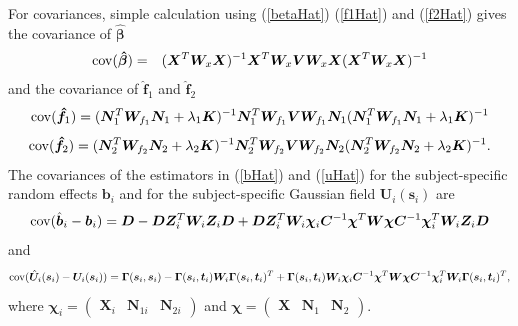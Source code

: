 \documentclass[12pt, notitlepage]{article}
\begin{document}
  
For covariances, simple calculation using (\ref{betaHat}) (\ref{f1Hat}) and (\ref{f2Hat}) gives the covariance of $\boldsymbol {\hat \beta}$  
\begin{eqnarray*}
{\rm cov}(\boldsymbol {\hat \beta}) 
&=&
(\boldsymbol X^T  \boldsymbol W_x \boldsymbol X )^{-1} \boldsymbol X^T  \boldsymbol W_x 
\boldsymbol V 
\boldsymbol W_x \boldsymbol X (\boldsymbol X^T  \boldsymbol W_x \boldsymbol X )^{-1} 
\end{eqnarray*}
and the covariance of $\boldsymbol {\hat f}_1$  and $\boldsymbol {\hat f}_2$
$$
{\rm cov}(\boldsymbol {\hat f}_1) 
=
(\boldsymbol N_1^T 
\boldsymbol W_{f_1}  \boldsymbol N_1
  + \lambda_1 \boldsymbol K)^{-1}  \boldsymbol N_1^T \boldsymbol W_{f_1}
   \boldsymbol V 
\boldsymbol W_{f_1} \boldsymbol N_1
(\boldsymbol N_1^T 
\boldsymbol W_{f_1}  \boldsymbol N_1
  + \lambda_1 \boldsymbol K)^{-1}
$$
$$
{\rm cov}(\boldsymbol {\hat f}_2) 
=
(\boldsymbol N_2^T \boldsymbol W_{f_2}  \boldsymbol N_2 + \lambda_2 \boldsymbol K)^{-1} 
\boldsymbol N_2^T \boldsymbol W_{f_2} 
   \boldsymbol V 
\boldsymbol W_{f_2} \boldsymbol N_2
(\boldsymbol N_2^T \boldsymbol W_{f_2}  \boldsymbol N_2 + \lambda_2 \boldsymbol K)^{-1}.
$$
The covariances of the estimators in (\ref{bHat}) and (\ref{uHat}) for the subject-specific random effects $\boldsymbol b_i$ and for the subject-specific Gaussian field $\boldsymbol U_i(\boldsymbol s_i)$
 are  
$$
{\rm cov}(\hat{\boldsymbol b}_i - \boldsymbol b_i) 
= \boldsymbol D 
-
\boldsymbol D \boldsymbol Z_i^T \boldsymbol W_i  \boldsymbol Z_i  \boldsymbol D 
+
\boldsymbol D \boldsymbol Z_i^T \boldsymbol W_i
\boldsymbol \chi_i  \boldsymbol C^{-1} \boldsymbol \chi^T
\boldsymbol W
\boldsymbol \chi  \boldsymbol C^{-1} \boldsymbol \chi_i^T
\boldsymbol  W_i \boldsymbol Z_i \boldsymbol D
$$
and 
$$
{\rm cov}(\hat{\boldsymbol U}_i (\boldsymbol s_i) - \boldsymbol U_i (\boldsymbol s_i) ) 
= \boldsymbol \Gamma(\boldsymbol s_i, \boldsymbol s_i) 
-
\boldsymbol \Gamma(\boldsymbol s_i, \boldsymbol t_i) 
\boldsymbol W_i  
\boldsymbol \Gamma(\boldsymbol s_i, \boldsymbol t_i)^T 
+
\boldsymbol \Gamma(\boldsymbol s_i, \boldsymbol t_i) \boldsymbol W_i
\boldsymbol \chi_i  \boldsymbol C^{-1} \boldsymbol \chi^T
\boldsymbol W
\boldsymbol \chi  \boldsymbol C^{-1} \boldsymbol \chi_i^T
\boldsymbol  W_i \boldsymbol \Gamma(\boldsymbol s_i, \boldsymbol t_i)^T,
$$
where 
$
\boldsymbol \chi_i 
=
\begin{pmatrix}
\boldsymbol X_i & \boldsymbol N_{1i} & \boldsymbol N_{2i}
\end{pmatrix}
$
and
$
\boldsymbol \chi 
=
\begin{pmatrix}
\boldsymbol X & \boldsymbol N_1 & \boldsymbol N_2
\end{pmatrix}.
$
\end{document}
